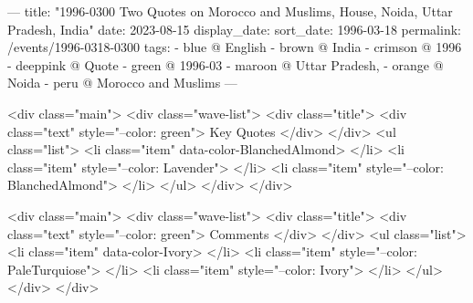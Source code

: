 ---
title: "1996-0300 Two Quotes on Morocco and Muslims, House, Noida, Uttar Pradesh, India"
date: 2023-08-15
display_date: 
sort_date: 1996-03-18
permalink: /events/1996-0318-0300
tags:
  - blue @ English
  - brown @ India
  - crimson @ 1996
  - deeppink @ Quote
  - green @ 1996-03
  - maroon @ Uttar Pradesh,
  - orange @ Noida
  - peru @ Morocco and Muslims
---

<div class="main">
  <div class="wave-list">
    <div class="title">
      <div class="text" style="--color: green">
        Key Quotes
      </div>
    </div>
    <ul class="list">
        <li class="item" data-color-BlanchedAlmond>
        </li>
        <li class="item" style="--color: Lavender">
        </li>
        <li class="item" style="--color: BlanchedAlmond">
        </li>
      </ul>
  </div>
</div>

<div class="main">
  <div class="wave-list">
    <div class="title">
      <div class="text" style="--color: green">
        Comments
      </div>
    </div>
    <ul class="list">
        <li class="item" data-color-Ivory>
        </li>
        <li class="item" style="--color: PaleTurquiose">
        </li>
        <li class="item" style="--color: Ivory">
        </li>
      </ul>
  </div>
</div>